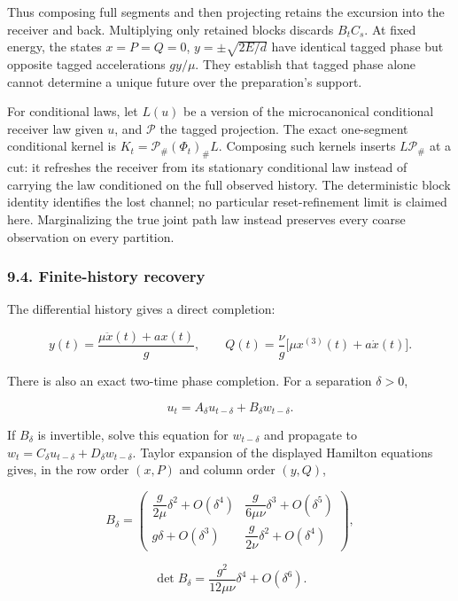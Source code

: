 \documentclass[11pt,a4paper]{article}
\begin{document}
Thus composing full segments and then projecting retains the excursion
into the receiver and back. Multiplying only retained blocks discards
\(B_tC_s\). At fixed energy, the states \(x=P=Q=0\),
\(y=\pm\sqrt{2E/d}\) have identical tagged phase but opposite tagged
accelerations \(gy/\mu\). They establish that tagged phase alone cannot
determine a unique future over the preparation's support.

For conditional laws, let \(L(u)\) be a version of the microcanonical
conditional receiver law given \(u\), and \(\mathcal P\) the tagged
projection. The exact one-segment conditional kernel is
\(K_t=\mathcal P_\#(\Phi_t)_\#L\). Composing such kernels inserts
\(L\mathcal P_\#\) at a cut: it refreshes the receiver from its
stationary conditional law instead of carrying the law conditioned on
the full observed history. The deterministic block identity identifies
the lost channel; no particular reset-refinement limit is claimed here.
Marginalizing the true joint path law instead preserves every coarse
observation on every partition.

\hypertarget{finite-history-recovery}{%
\subsubsection{9.4. Finite-history
recovery}\label{finite-history-recovery}}

The differential history gives a direct completion:

\[y(t)=\frac{\mu\ddot x(t)+ax(t)}g,\qquad
Q(t)=\frac\nu g\big[\mu x^{(3)}(t)+a\dot x(t)\big].\]

There is also an exact two-time phase completion. For a separation
\(\delta>0\),

\[u_t=A_\delta u_{t-\delta}+B_\delta w_{t-\delta}.\]

If \(B_\delta\) is invertible, solve this equation for \(w_{t-\delta}\)
and propagate to \(w_t=C_\delta u_{t-\delta}+D_\delta w_{t-\delta}\).
Taylor expansion of the displayed Hamilton equations gives, in the row
order \((x,P)\) and column order \((y,Q)\),

\[
B_\delta=
\begin{pmatrix}
\dfrac{g}{2\mu}\delta^2+O(\delta^4)&
\dfrac{g}{6\mu\nu}\delta^3+O(\delta^5)\\
g\delta+O(\delta^3)&
\dfrac{g}{2\nu}\delta^2+O(\delta^4)
\end{pmatrix},
\]

\[\det B_\delta=\frac{g^2}{12\mu\nu}\delta^4+O(\delta^6).\]
\end{document}
